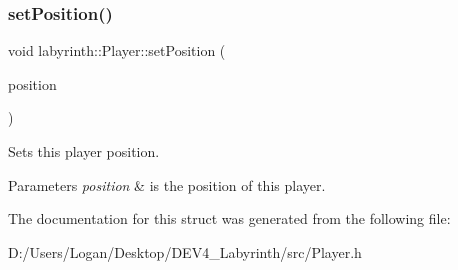 \subsubsection{\texorpdfstring{setPosition()}{setPosition()}}
{\footnotesize\ttfamily void labyrinth\+::\+Player\+::set\+Position (\begin{DoxyParamCaption}\item[{const Maze\+Position \&}]{position }\end{DoxyParamCaption})\hspace{0.3cm}{\ttfamily [inline]}}



Sets this player position. 


\begin{DoxyParams}{Parameters}
{\em position} & is the position of this player. \\
\hline
\end{DoxyParams}


The documentation for this struct was generated from the following file\+:\begin{DoxyCompactItemize}
\item 
D\+:/\+Users/\+Logan/\+Desktop/\+D\+E\+V4\+\_\+\+Labyrinth/src/Player.\+h\end{DoxyCompactItemize}
